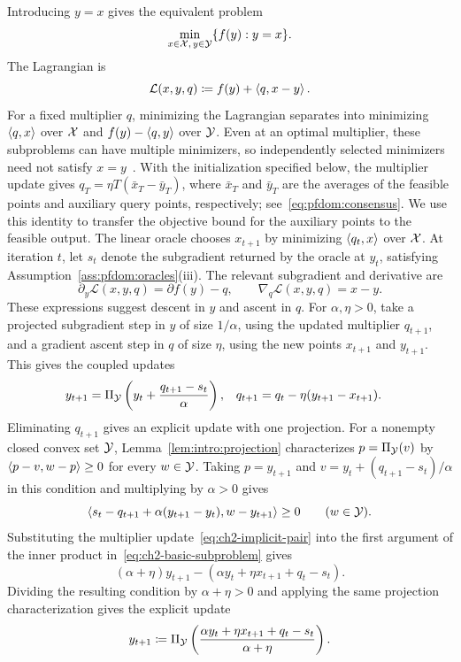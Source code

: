 Introducing $y=x$ gives the equivalent problem
\[
    \min_{x\in\mathcal{X},\,y\in\mathcal{Y}}\{f(y):y=x\}.
\]
The Lagrangian is
\[
    \mathcal L(x,y,q)\coloneqq f(y)+\left\langle q,x-y \right\rangle.
\]
For a fixed multiplier $q$, minimizing the Lagrangian separates into
minimizing $\left\langle q,x \right\rangle$ over $\mathcal{X}$ and $f(y)-\left\langle q,y \right\rangle$ over $\mathcal{Y}$.
Even at an optimal multiplier, these subproblems can have multiple
minimizers, so independently selected minimizers need not satisfy
$x=y$~\cite[Section~5.5.5]{boyd_vandenberghe_2004}.
With the initialization specified below, the multiplier update gives
$q_T=\eta T(\bar x_T-\bar y_T)$, where $\bar x_T$ and $\bar y_T$ are the
averages of the feasible points and auxiliary query points, respectively;
see~\eqref{eq:pfdom:consensus}. We use this identity to transfer the
objective bound for the auxiliary points to the feasible output.
The linear oracle chooses $x_{t+1}$ by minimizing
$\left\langle q_t,x \right\rangle$ over $\mathcal{X}$. At iteration $t$, let $s_t$ denote the
subgradient returned by the oracle at $y_t$, satisfying
Assumption~\ref{ass:pfdom:oracles}(iii). The relevant subgradient and derivative are
\[
    \partial_y\mathcal L(x,y,q)=\partial f(y)-q,
    \qquad
    \nabla_q\mathcal L(x,y,q)=x-y.
\]
These expressions suggest descent in $y$ and ascent in $q$.
For $\alpha,\eta>0$, take a projected subgradient step in $y$ of size
$1/\alpha$, using the updated multiplier $q_{t+1}$, and a gradient ascent
step in $q$ of size $\eta$, using the new points $x_{t+1}$ and $y_{t+1}$.
This gives the coupled updates
\begin{align}\label{eq:ch2-implicit-pair}
    y_{t+1}&=\Pi_{\mathcal{Y}}\left(y_t+\frac{q_{t+1}-s_t}{\alpha}\right),&
    q_{t+1}&=q_t-\eta(y_{t+1}-x_{t+1}).
\end{align}
Eliminating $q_{t+1}$ gives an explicit update with one projection.
For a nonempty closed convex set $\mathcal{Y}$, Lemma~\ref{lem:intro:projection}
characterizes $p=\Pi_{\mathcal{Y}}(v)$ by
$\left\langle p-v,w-p \right\rangle\geq0$ for every $w\in\mathcal{Y}$.
Taking $p=y_{t+1}$ and $v=y_t+(q_{t+1}-s_t)/\alpha$ in this
condition and multiplying by $\alpha>0$ gives
\begin{equation}\label{eq:ch2-basic-subproblem}
    \left\langle s_t-q_{t+1}+\alpha(y_{t+1}-y_t),w-y_{t+1} \right\rangle
    \geq0\qquad(w\in\mathcal{Y}).
\end{equation}
Substituting the multiplier update~\eqref{eq:ch2-implicit-pair} into
the first argument of the inner product in~\eqref{eq:ch2-basic-subproblem} gives
\[
    (\alpha+\eta)y_{t+1}
      -(\alpha y_t+\eta x_{t+1}+q_t-s_t).
\]
Dividing the resulting condition by $\alpha+\eta>0$ and applying the
same projection characterization gives the explicit update
\begin{equation}\label{eq:ch2-basic-updates}
    y_{t+1}\coloneqq\Pi_{\mathcal{Y}}\left(
    \frac{\alpha y_t+\eta x_{t+1}+q_t-s_t}{\alpha+\eta}\right).
\end{equation}

